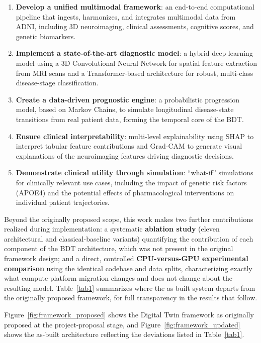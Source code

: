 \documentclass[pdflatex,sn-mathphys-num]{sn-jnl}%
\providecommand{\tightlist}{%
  \setlength{\itemsep}{0pt}\setlength{\parskip}{0pt}}%
\theoremstyle{thmstyleone}%
\theoremstyle{thmstyletwo}%
\theoremstyle{thmstylethree}%
\begin{document}
\begin{enumerate}
\def\labelenumi{\arabic{enumi}.}
\tightlist
\item
  \textbf{Develop a unified multimodal framework}: an end-to-end
  computational pipeline that ingests, harmonizes, and integrates
  multimodal data from ADNI, including 3D neuroimaging, clinical
  assessments, cognitive scores, and genetic biomarkers.
\item
  \textbf{Implement a state-of-the-art diagnostic model}: a hybrid deep
  learning model using a 3D Convolutional Neural Network for spatial
  feature extraction from MRI scans and a Transformer-based architecture
  for robust, multi-class disease-stage classification.
\item
  \textbf{Create a data-driven prognostic engine}: a probabilistic
  progression model, based on Markov Chains, to simulate longitudinal
  disease-state transitions from real patient data, forming the temporal
  core of the BDT.
\item
  \textbf{Ensure clinical interpretability}: multi-level explainability
  using SHAP to interpret tabular feature contributions and Grad-CAM to
  generate visual explanations of the neuroimaging features driving
  diagnostic decisions.
\item
  \textbf{Demonstrate clinical utility through simulation}: ``what-if''
  simulations for clinically relevant use cases, including the impact of
  genetic risk factors (APOE4) and the potential effects of
  pharmacological interventions on individual patient trajectories.
\end{enumerate}

Beyond the originally proposed scope, this work makes two further
contributions realized during implementation: a systematic
\textbf{ablation study} (eleven architectural and classical-baseline
variants) quantifying the contribution of each component of the BDT
architecture, which was not present in the original framework design;
and a direct, controlled \textbf{CPU-versus-GPU experimental comparison}
using the identical codebase and data splits, characterizing exactly
what compute-platform migration changes and does not change about the
resulting model. Table~\ref{tab1} summarizes where the as-built system departs
from the originally proposed framework, for full transparency in the
results that follow.

Figure~\ref{fig:framework_proposed} shows the Digital Twin framework as originally proposed at the project-proposal stage, and Figure~\ref{fig:framework_updated} shows the as-built architecture reflecting the deviations listed in Table~\ref{tab1}.
\end{document}
